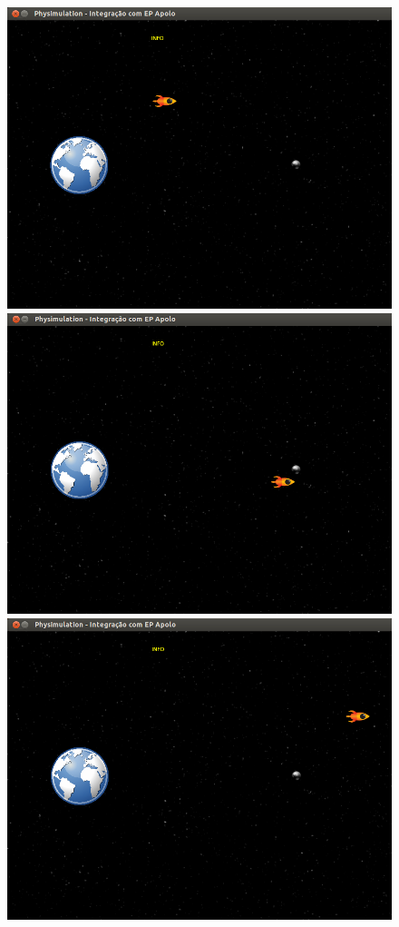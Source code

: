 \begin{figure}[H]
    \centering
	\includegraphics[scale=0.22]{images/apolo-4.png}
	\includegraphics[scale=0.22]{images/apolo-6.png}
	\includegraphics[scale=0.22]{images/apolo-3.png}

\end{figure}
